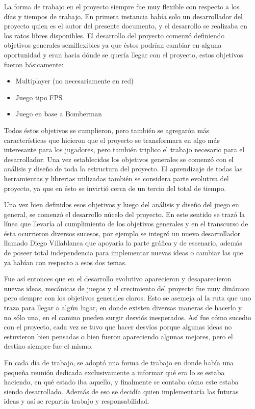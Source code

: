 \documentclass[a4paper,12pt,openany,oneside]{book}
\begin{document}
La forma de trabajo en el proyecto siempre fue muy flexible con respecto a los días y tiempos de trabajo. En primera instancia había solo un desarrollador del proyecto quien es el autor del presente documento, y el desarrollo se realizaba en los ratos libres disponibles.
El desarrollo del proyecto comenzó definiendo objetivos generales semiflexibles ya que éstos podrían cambiar en alguna oportunidad y eran hacia dónde se quería llegar con el proyecto, estos objetivos fueron básicamente:
\begin{itemize}
\item Multiplayer (no necesariamente en red)
\item Juego tipo FPS
\item Juego en base a Bomberman
\end{itemize}
Todos éstos objetivos se cumplieron, pero también se agregarón más características que hicieron que el proyecto se transformara en algo más interesante para los jugadores, pero también triplico el trabajo necesario para el desarrollador. Una vez establecidos los objetivos generales se comenzó con el análisis y diseño de toda la estructura del proyecto. El aprendizaje de todas las herramientas y librerias utilizadas también se considera parte evolutiva del proyecto, ya que en ésto se invirtió cerca de un tercio del total de tiempo.

Una vez bien definidos esos objetivos y luego del análisis y diseño del juego en general, se comenzó el desarrollo núcelo del proyecto. En este sentido se trazó la línea que llevaría al cumplimiento de los objetivos generales y en el transcurso de ésta ocurrieron diversos sucesos, por ejemplo se integró un nuevo desarrollador llamado Diego Villablanca que apoyaría la parte gráfica y de escenario, además de poseer total independencia para implementar nuevas ideas o cambiar las que ya habían con respecto a esos dos temas.

Fue así entonces que en el desarrollo evolutivo aparecieron y desaparecieron nuevas ideas, mecánicas de juegos y el crecimiento del proyecto fue muy dinámico pero siempre con los objetivos generales claros. Esto se asemeja al la ruta que uno traza para llegar a algún lugar, en donde existen diversas maneras de hacerlo y no sólo una, en el camino pueden surgir desviós inesperados. Así fue cómo sucedio con el proyecto, cada vez se tuvo que hacer desvíos porque algunas ideas no estuvieron bien pensadas o bien fueron apareciendo algunas mejores, pero el destino siempre fue el mismo.

En cada día de trabajo, se adoptó una forma de trabajo en donde había una pequeña reunión dedicada exclusivamente a informar qué era lo se estaba haciendo, en qué estado iba aquello, y finalmente se contaba cómo este estaba siendo desarrollado. Además de eso se decidía quien implementaría las futuras ideas y así se repartía trabajo y responsabilidad.
\end{document}
